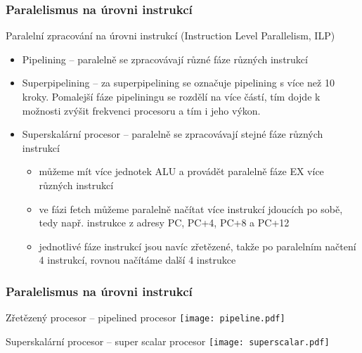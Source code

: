\documentclass{beamer}
\begin{document}
\begin{frame}
\frametitle{Paralelismus na úrovni instrukcí}

Paralelní zpracování na úrovni instrukcí (Instruction Level Parallelism, ILP)
\begin{itemize}
 \item Pipelining -- paralelně se zpracovávají různé fáze různých instrukcí
 \item Superpipelining -- za superpipelining se označuje pipelining s více než 10 kroky. Pomalejší fáze pipeliningu se rozdělí na více částí, tím dojde k možnosti zvýšit frekvenci procesoru a tím i jeho výkon.
 \item Superskalární procesor -- paralelně se zpracovávají stejné fáze různých instrukcí
\begin{itemize}
\item můžeme mít více jednotek ALU a provádět paralelně fáze EX více různých instrukcí
\item ve fázi fetch můžeme paralelně načítat více instrukcí jdoucích po sobě, tedy např. instrukce z adresy PC, PC+4, PC+8 a PC+12
\item jednotlivé fáze instrukcí jsou navíc zřetězené, takže po paralelním načtení 4 instrukcí, rovnou načítáme další 4 instrukce 
\end{itemize}
\end{itemize}

\end{frame}

\begin{frame}
\frametitle{Paralelismus na úrovni instrukcí}

Zřetězený procesor -- pipelined procesor
\texttt{[image: pipeline.pdf]}

Superskalární procesor -- super scalar procesor
\texttt{[image: superscalar.pdf]}

\end{frame}
\end{document}
